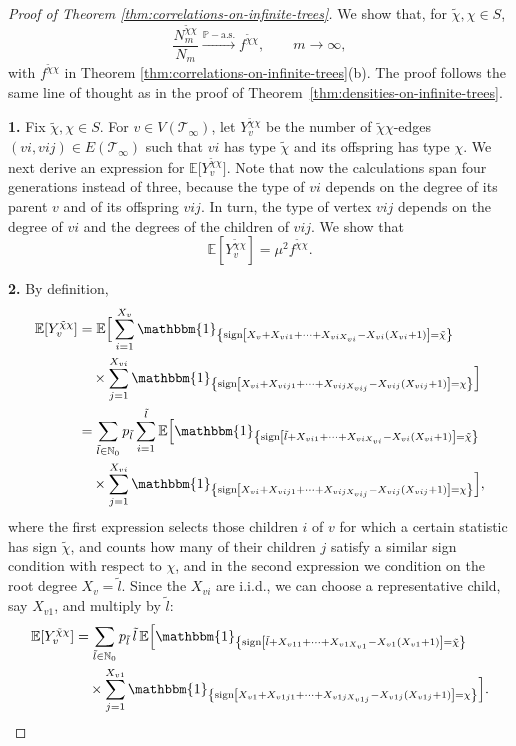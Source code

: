 \documentclass[11pt]{article}
\numberwithin{equation}{section}
\theoremstyle{plain}
\newcommand{\N}{\mathbb N}
\newcommand{\EE}{\mathbb E}
\newcommand{\PP}{\mathbb{P}}
\newcommand{\Tt}{\mathcal{T}}
\newcommand{\tl}{\tilde{l}}
\newcommand{\tchi}{{\tilde{\chi}}}
\newcommand{\ind}[1]{\mathbbm{1}_{\left\{#1\right\}}}
\begin{document}
\begin{proof}[Proof of Theorem \ref{thm:correlations-on-infinite-trees}]
We show that, for $\tchi ,\chi \in S$,
\begin{equation}
\label{eq:limit-tree*}
\frac{N^{\tchi\chi}_m}{N_m} \stackrel{\PP-\mathrm{a.s.}}{\longrightarrow} f^{\tchi\chi}, \qquad m\to\infty,
\end{equation}
with $f^{\tchi\chi}$ in Theorem \ref{thm:correlations-on-infinite-trees}(b). The proof follows the same line of thought as in the proof of Theorem~\ref{thm:densities-on-infinite-trees}. 

\medskip\noindent
{\bf 1.}
Fix $\tchi,\chi \in S$. For $v\in V(\Tt_\infty)$, let $Y_v^{\tchi\chi}$ be the number of $\tchi\chi$-edges $(vi,vij)\in E(\Tt_\infty)$ such that $vi$ has type $\tchi$ and its offspring has type $\chi$. We next derive an expression for $\EE\big[Y_v^{\tchi\chi}\big]$. Note that now the calculations span four generations instead of three, because the type of $vi$ depends on the degree of its parent $v$ and of its offspring $vij$. In turn, the type of vertex $vij$ depends on the degree of $vi$ and the degrees of the children of $vij$. We show that 
\begin{equation}\label{eq:tchichi}
\EE[Y_v^{\tchi\chi}]= \mu^2 f^{\tchi \chi}.
\end{equation}

\medskip\noindent
{\bf 2.}
By definition,
\begin{align*}
\EE[Y_v^{\tchi\chi}]
&= \EE\Big[\sum_{i=1}^{X_v} \ind{{\rm sign}\left[X_v+X_{vi1}+\cdots+X_{viX_{vi}}-X_{vi}(X_{vi}+1)\right]=\tchi}\\
&\quad\times\sum_{j=1}^{X_{vi}}\ind{{\rm sign}\left[X_{vi}+X_{vij1}+\cdots+X_{vijX_{vij}}-X_{vij}(X_{vij}+1)\right]=\chi}\Big]\\
&= \sum_{\tl\in\N_0} p_{\tl} \sum_{i=1}^{\tl} \EE\Big[\ind{{\rm sign}\left[\tl+X_{vi1}+\cdots+X_{viX_{vi}}-X_{vi}
(X_{vi}+1)\right]=\tchi} \\
&\quad\times\sum_{j=1}^{X_{vi}} \ind{{\rm sign}\left[X_{vi}+X_{vij1}+\cdots+X_{vijX_{vij}}-X_{vij}(X_{vij}+1)\right]=\chi}\Big],
\end{align*}
\noindent
where the first expression selects those children $i$ of $v$ for which a certain statistic has sign $\tchi$, and counts how many of their children $j$ satisfy a similar sign condition with respect to $\chi$, and in the second expression we condition on the root degree $X_v = \tl$. Since the $X_{vi}$ are i.i.d., we can choose a representative child, say $X_{v1}$, and multiply by $\tl$:
\begin{align*}
\EE[Y_v^{\tchi\chi}]&= \sum_{\tl\in\N_0} p_{\tl}\,\tl\,\EE\Big[\ind{{\rm sign}\left[\tl+X_{v11}+\cdots+X_{v1X_{v1}}-X_{v1}(X_{v1}+1)\right]=\tchi} \\
&\quad\times\sum_{j=1}^{X_{v1}} \ind{{\rm sign}\left[X_{v1}+X_{v1j1}
+\cdots+X_{v1jX_{v1j}}-X_{v1j}(X_{v1j}+1)\right]
=\chi}\Big].
\end{align*}


\end{proof}
\end{document}
